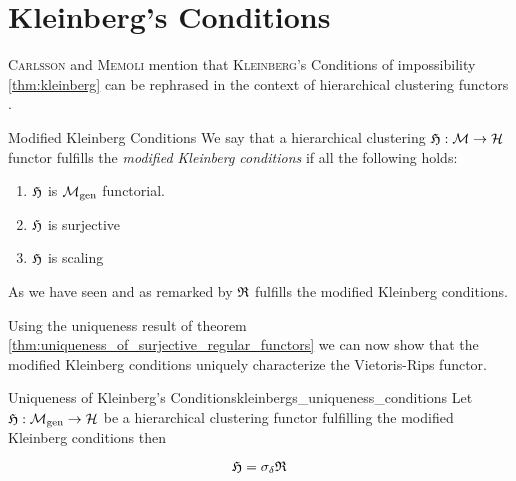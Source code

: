 \section{Kleinberg's Conditions}

\textsc{Carlsson} and \textsc{Memoli} mention that \textsc{Kleinberg}'s Conditions of impossibility \ref{thm:kleinberg} can be rephrased in the context of hierarchical clustering functors 
\cite[Comment~7.3.1]{Carlsson2010}.

\begin{definition}{Modified Kleinberg Conditions}{}
    We say that a hierarchical clustering $\mathfrak{H}: \mathcal{M} \to \mathcal{H}$ functor fulfills the \emph{modified Kleinberg conditions} if all the following holds:
    \begin{enumerate}
        \item $\mathfrak{H}$ is ${\mathcal{M}_\mathrm{gen}}$ functorial.
        \item $\mathfrak{H}$ is surjective
        \item $\mathfrak{H}$ is scaling
    \end{enumerate}
\end{definition}

As we have seen and as remarked by \cite{Carlsson2010} $\mathfrak{R}$ fulfills the modified Kleinberg conditions.

Using the uniqueness result of theorem \ref{thm:uniqueness_of_surjective_regular_functors} we can now show that the modified Kleinberg conditions uniquely characterize the Vietoris-Rips functor.

\begin{theorem}{Uniqueness of Kleinberg's Conditions}{kleinbergs_uniqueness_conditions}
    Let $\mathfrak{H}: {\mathcal{M}_\mathrm{gen}} \to \mathcal{H}$ be a hierarchical clustering functor fulfilling the modified Kleinberg conditions then

    $$
    \mathfrak{H} = \sigma_\delta \mathfrak{R}
    $$

\end{theorem}




